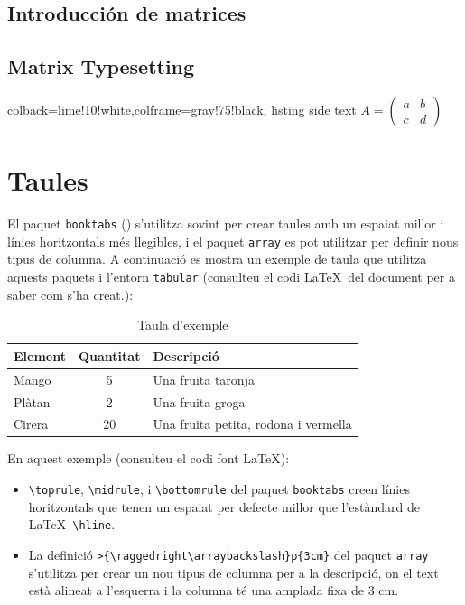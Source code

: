   \subsection{Introducción de matrices}
\else
  \subsection{Matrix Typesetting}
\fi
  
\begin{tcblisting}{colback=lime!10!white,colframe=gray!75!black,
  listing side text}
$A = \begin{pmatrix}
  a & b \\
  c & d
\end{pmatrix}$
\end{tcblisting}
  
\ifcase\doclanguage\or
  \section{Taules}
  
  El paquet \texttt{booktabs} (\cite{booktabs}) s'utilitza sovint per crear taules amb un espaiat millor i línies horitzontals més llegibles, i el paquet \texttt{array} es pot utilitzar per definir nous tipus de columna. A continuació es mostra un exemple de taula que utilitza aquests paquets i l'entorn \texttt{tabular} (consulteu el codi \LaTeX\ del document per a saber com s'ha creat.):
  
  \begin{table}[h]
    \centering
    \caption{Taula d'exemple}\label{tbl:taula1}
    \begin{tabular}{@{} l c >{\raggedright\arraybackslash}p{6.5cm} @{}}
      \toprule
      Element & Quantitat & Descripció \\
      \midrule
      Mango & 5 & Una fruita taronja \\
      Plàtan & 2 & Una fruita groga \\
      Cirera & 20 & Una fruita petita, rodona i vermella \\
      \bottomrule
    \end{tabular}
  \end{table}
  
  En aquest exemple (consulteu el codi font \LaTeX):
  
  \begin{itemize}
    \item \verb|\toprule|, \verb|\midrule|, i \verb|\bottomrule| del paquet \texttt{booktabs} creen línies horitzontals que tenen un espaiat per defecte millor que l'estàndard de \LaTeX\ \verb|\hline|.

    \item La definició \verb|>{\raggedright\arraybackslash}p{3cm}| del paquet \texttt{array} s'utilitza per crear un nou tipus de columna per a la descripció, on el text està alineat a l'esquerra i la columna té una amplada fixa de 3 cm.
  \end{itemize}
  

